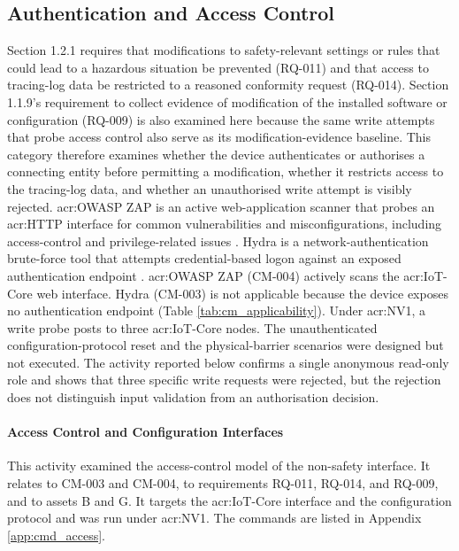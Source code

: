 \subsection{Authentication and Access Control}
\label{subsec:cat_access}
Section 1.2.1 requires that modifications to safety-relevant settings or rules that could lead to a hazardous situation be prevented (RQ-011) and that access to tracing-log data be restricted to a reasoned conformity request (RQ-014). Section 1.1.9's requirement to collect evidence of modification of the installed software or configuration (RQ-009) is also examined here because the same write attempts that probe access control also serve as its modification-evidence baseline. This category therefore examines whether the device authenticates or authorises a connecting entity before permitting a modification, whether it restricts access to the tracing-log data, and whether an unauthorised write attempt is visibly rejected. \gls{acr:OWASP} ZAP is an active web-application scanner that probes an \gls{acr:HTTP} interface for common vulnerabilities and misconfigurations, including access-control and privilege-related issues \cite{zaproxy_getting_started}. Hydra is a network-authentication brute-force tool that attempts credential-based logon against an exposed authentication endpoint \cite{kali_hydra}. \gls{acr:OWASP} ZAP (CM-004) actively scans the \gls{acr:IoT}-Core web interface. Hydra (CM-003) is not applicable because the device exposes no authentication endpoint (Table \ref{tab:cm_applicability}).
Under \gls{acr:NV1}, a write probe posts to three \gls{acr:IoT}-Core nodes. The unauthenticated configuration-protocol reset and the physical-barrier scenarios were designed but not executed. The activity reported below confirms a single anonymous read-only role and shows that three specific write requests were rejected, but the rejection does not distinguish input validation from an authorisation decision.

\paragraph{Access Control and Configuration Interfaces} 
\label{subsec:res_access_control}
This activity examined the access-control model of the non-safety interface. It relates to CM-003 and CM-004, to requirements RQ-011, RQ-014, and RQ-009, and to assets B and G. It targets the \gls{acr:IoT}-Core interface and the configuration protocol and was run under \gls{acr:NV1}. The commands are listed in Appendix \ref{app:cmd_access}.

